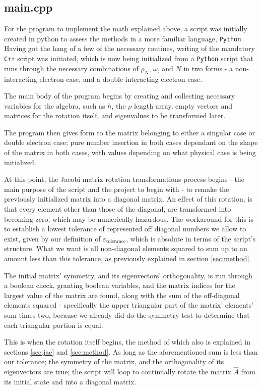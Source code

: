 \documentclass[11pt,a4paper,notitlepage]{article}
\begin{document}
\subsection{main.cpp}
For the program to implement the math explained above, a script was initially created in python to assess the methods in a more familiar language, \verb|Python|. Having got the hang of a few of the necessary routines, writing of the mandatory \verb|C++| script was initiated, which is now being initialized from a \verb|Python| script that runs through the necessary combinations of $\rho_N$, $\omega$, and $N$ in two forms - a non-interacting electron case, and a double interacting electron case.
  
The main body of the program begins by creating and collecting necessary variables for the algebra, such as $h$, the $\rho$ length array, empty vectors and matrices for the rotation itself, and eigenvalues to be transformed later.
  
  The program then gives form to the matrix belonging to either a singular case or double electron case; pure number insertion in both cases dependant on the shape of the matrix in both cases, with values depending on what physical case is being initialized.
  
 At this point, the Jacobi matrix rotation transformations process begins - the main purpose of the script and the project to begin with - to remake the previously initialized matrix into a diagonal matrix. An effect of this rotation, is that every element other than those of the diagonal, are transformed into becoming zero, which may be numerically hazardous. The workaround for this is to establish a lowest tolerance of represented off diagonal numbers we allow to exist, given by our definition of $\varepsilon_\text{tolerance}$, which is absolute in terms of the script's structure. What we want is all non-diagonal elements squared to sum up to an amount less than this tolerance, as previously explained in section \ref{sec:method}.
 
 The initial matrix' symmetry, and its eigenvectors' orthogonality, is run through a boolean check, granting boolean variables, and the matrix indices for the largest value of the matrix are found, along with the sum of the off-diagonal elements squared - specifically the upper triangular part of the matrix' elements' sum times two, because we already did do the symmetry test to determine that each triangular portion is equal.
 
 This is when the rotation itself begins, the method of which also is explained in sections \ref{sec:jac} and \ref{sec:method}. As long as the aforementioned sum is less than our tolerance; the symmetry of the matrix, and the orthogonality of its eigenvectors are true; the script will loop to continually rotate the matrix $\hat{A}$ from its initial state and into a diagonal matrix.
  
\end{document}
